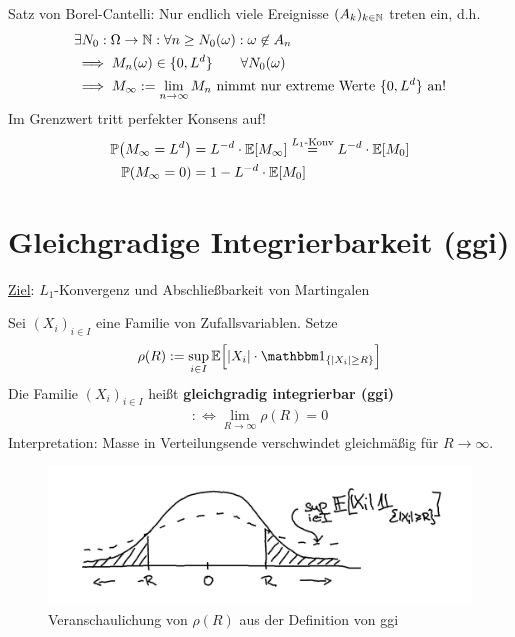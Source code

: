 \begin{beisp}[Wählermodell]
Satz von Borel-Cantelli: Nur endlich viele Ereignisse $(A_k)_{k\in\mathbb{N}}$ treten ein, d.h.
\begin{align*}
&\exists N_0:\Omega\to\mathbb{N}:\forall n\geq N_0(\omega):\omega\not\in A_n\\
&\implies M_n(\omega)\in\lbrace0,L^d\rbrace\qquad\forall N_0(\omega)\\
&\implies M_\infty:=\lim\limits_{n\to\infty} M_n\text{ nimmt nur extreme Werte $\lbrace0,L^d\rbrace$ an!}
\end{align*}
Im Grenzwert tritt perfekter Konsens auf!
\begin{align*}
\mathbb{P}\big(M_\infty=L^d\big)&=L^{-d}\cdot\mathbb{E}[M_\infty]\stackrel{L_1\text{-Konv}}{=} L^{-d}\cdot\mathbb{E}[M_0]\\
\mathbb{P}(M_\infty=0)&=1-L^{-d}\cdot\mathbb{E}[M_0]
\end{align*}
\end{beisp}

\setcounter{section}{1} %
\section{Gleichgradige Integrierbarkeit (ggi)} %
\setcounter{section}{4} %
\ul{Ziel}: $L_1$-Konvergenz und Abschließbarkeit von Martingalen

\begin{defi}
Sei $(X_i)_{i\in I}$ eine Familie von Zufallsvariablen. Setze
\begin{align*}
\rho(R):=\sup\limits_{i\in I}\E\Big[|X_i|\cdot\indi_{\lbrace |X_i|\geq R\rbrace}\Big]
\end{align*}
Die Familie $(X_i)_{i\in I}$ heißt \textbf{gleichgradig integrierbar (ggi)}
\begin{align*}
:\Longleftrightarrow\lim\limits_{R\to\infty}\rho(R)=0
\end{align*}
Interpretation: Masse in Verteilungsende verschwindet gleichmäßig für $R\to\infty$.
\begin{figure}[h!]
	\begin{center}
		\includegraphics[width=\textwidth]{pics/Sketch3.png}
		\caption{Veranschaulichung von $\rho(R)$ aus der Definition von ggi}
		\label{AbbRhoGGI}
	\end{center}
\end{figure}
\end{defi}

